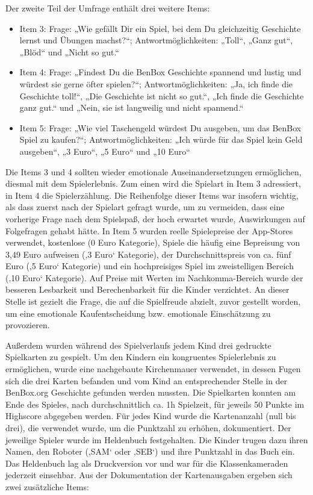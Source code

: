 \documentclass[
  a4paper,
  DIV=11,
  numbers=noendperiod,
  onecolumn,
  oneside,
  a4paper]{scrartcl}
\providecommand{\tightlist}{%
  \setlength{\itemsep}{0pt}\setlength{\parskip}{0pt}}
\begin{document}
Der zweite Teil der Umfrage enthält drei weitere Items:

\begin{itemize}
\tightlist
\item
  Item 3: Frage: „Wie gefällt Dir ein Spiel, bei dem Du gleichzeitig
  Geschichte lernst und Übungen machst?{}``; Antwortmöglichkeiten:
  „Toll``, „Ganz gut``, „Blöd`` und „Nicht so gut.``
\item
  Item 4: Frage: „Findest Du die BenBox Geschichte spannend und lustig
  und würdest sie gerne öfter spielen?{}``; Antwortmöglichkeiten: „Ja,
  ich finde die Geschichte toll!{}``, „Die Geschichte ist nicht so
  gut.``, „Ich finde die Geschichte ganz gut.`` und „Nein, sie ist
  langweilig und nicht spannend.``
\item
  Item 5: Frage: „Wie viel Taschengeld würdest Du ausgeben, um das
  BenBox Spiel zu kaufen?{}``; Antwortmöglichkeiten: „Ich würde für das
  Spiel kein Geld ausgeben``, „3 Euro``, „5 Euro`` und „10 Euro``
\end{itemize}

Die Items 3 und 4 sollten wieder emotionale Auseinandersetzungen
ermöglichen, diesmal mit dem Spielerlebnis. Zum einen wird die Spielart
in Item 3 adressiert, in Item 4 die Spielerzählung. Die Reihenfolge
dieser Items war insofern wichtig, als dass zuerst nach der Spielart
gefragt wurde, um zu vermeiden, dass eine vorherige Frage nach dem
Spielspaß, der hoch erwartet wurde, Auswirkungen auf Folgefragen gehabt
hätte. In Item 5 wurden reelle Spielepreise der App-Stores verwendet,
kostenlose (0 Euro Kategorie), Spiele die häufig eine Bepreisung von
3,49 Euro aufweisen (‚3 Euro` Kategorie), der Durchschnittspreis von ca.
fünf Euro (‚5 Euro` Kategorie) und ein hochpreisiges Spiel im
zweistelligen Bereich (‚10 Euro` Kategorie). Auf Preise mit Werten im
Nachkomma-Bereich wurde der besseren Lesbarkeit und Berechenbarkeit für
die Kinder verzichtet. An dieser Stelle ist gezielt die Frage, die auf
die Spielfreude abzielt, zuvor gestellt worden, um eine emotionale
Kaufentscheidung bzw. emotionale Einschätzung zu provozieren.

Außerdem wurden während des Spielverlaufs jedem Kind drei gedruckte
Spielkarten zu gespielt. Um den Kindern ein kongruentes Spielerlebnis zu
ermöglichen, wurde eine nachgebaute Kirchenmauer verwendet, in dessen
Fugen sich die drei Karten befanden und vom Kind an entsprechender
Stelle in der BenBox.org Geschichte gefunden werden mussten. Die
Spielkarten konnten am Ende des Spieles, nach durchschnittlich ca. 1h
Spielzeit, für jeweils 50 Punkte im Highscore abgegeben werden. Für
jedes Kind wurde die Kartenanzahl (null bis drei), die verwendet wurde,
um die Punktzahl zu erhöhen, dokumentiert. Der jeweilige Spieler wurde
im Heldenbuch festgehalten. Die Kinder trugen dazu ihren Namen, den
Roboter (‚SAM` oder ‚SEB`) und ihre Punktzahl in das Buch ein. Das
Heldenbuch lag als Druckversion vor und war für die Klassenkameraden
jederzeit einsehbar. Aus der Dokumentation der Kartenausgaben ergeben
sich zwei zusätzliche Items:
\end{document}

